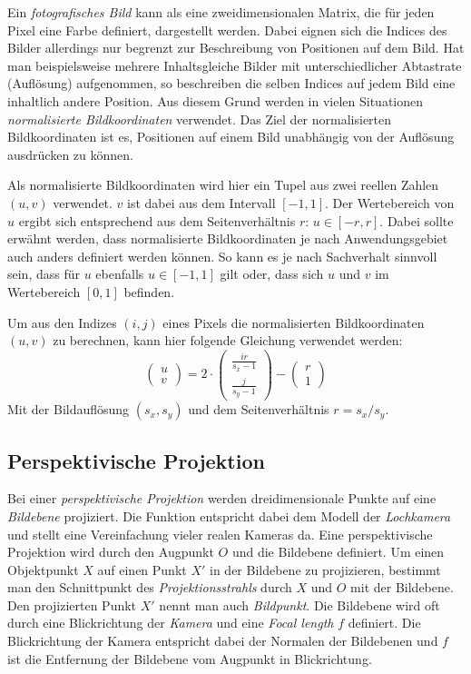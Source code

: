 \documentclass[ngerman,a4paper,parskip=half]{scrartcl}
\begin{document}
Ein \emph{fotografisches Bild} kann als eine zweidimensionalen Matrix, die für jeden Pixel eine Farbe definiert, dargestellt werden. Dabei eignen sich die Indices des Bilder allerdings nur begrenzt zur Beschreibung von Positionen auf dem Bild. Hat man beispielsweise mehrere Inhaltsgleiche Bilder mit unterschiedlicher Abtastrate (Auflösung) aufgenommen, so beschreiben die selben Indices auf jedem Bild eine inhaltlich andere Position. Aus diesem Grund werden in vielen Situationen \emph{normalisierte Bildkoordinaten} verwendet. Das Ziel der normalisierten Bildkoordinaten ist es, Positionen auf einem Bild unabhängig von der Auflösung ausdrücken zu können.

Als normalisierte Bildkoordinaten wird hier ein Tupel aus zwei reellen Zahlen $(u,v)$ verwendet. $v$ ist dabei aus dem Intervall $[-1,1]$. Der Wertebereich von $u$ ergibt sich entsprechend aus dem Seitenverhältnis $r$: $u \in [-r,r]$. Dabei sollte erwähnt werden, dass normalisierte Bildkoordinaten je nach Anwendungsgebiet auch anders definiert werden können. So kann es je nach Sachverhalt sinnvoll sein, dass für $u$ ebenfalls $u \in [-1,1]$ gilt oder, dass sich $u$ und $v$ im Wertebereich $[0,1]$ befinden.

Um aus den Indizes $(i,j)$ eines Pixels die normalisierten Bildkoordinaten $(u,v)$ zu berechnen, kann hier folgende Gleichung verwendet werden:
\[ \begin{pmatrix}
u \\ v
\end{pmatrix} = 2 \cdot \begin{pmatrix}
\frac{i r}{s_x - 1} \\
\frac{j}{s_y - 1}
\end{pmatrix} - \begin{pmatrix}
r \\ 1
\end{pmatrix} \]
Mit der Bildauflösung $(s_x, s_y)$ und dem Seitenverhältnis $r = s_x/s_y$.

\subsection{Perspektivische Projektion}
\label{sec:perspective}

Bei einer \emph{perspektivische Projektion} werden dreidimensionale Punkte auf eine \emph{Bildebene} projiziert. Die Funktion entspricht dabei dem Modell der \emph{Lochkamera} und stellt eine Vereinfachung vieler realen Kameras da. Eine perspektivische Projektion wird durch den Augpunkt $O$ und die Bildebene definiert. Um einen Objektpunkt $X$ auf einen Punkt $X'$ in der Bildebene zu projizieren, bestimmt man den Schnittpunkt des \emph{Projektionsstrahls} durch $X$ und $O$ mit der Bildebene. Den projizierten Punkt $X'$ nennt man auch \emph{Bildpunkt}. Die Bildebene wird oft durch eine Blickrichtung der \emph{Kamera} und eine \emph{Focal length} $f$ definiert. Die Blickrichtung der Kamera entspricht dabei der Normalen der Bildebenen und $f$ ist die Entfernung der Bildebene vom Augpunkt in Blickrichtung.
\end{document}
